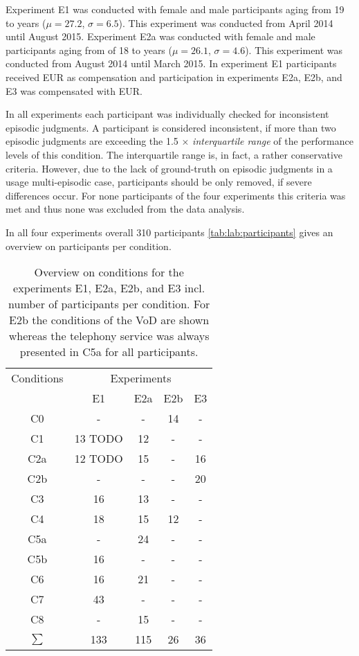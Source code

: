 Experiment E1 was conducted  with \unit[59]{female} and \unit[40]{male} participants aging from 19 to \unit[53]{years} ($\mu=27.2$, $\sigma=6.5$). %
This experiment was conducted from April 2014 until August 2015.
Experiment E2a was conducted with \unit[65]{female} and \unit[35]{male} participants aging from of 18 to \unit[50]{years} ($\mu=26.1$, $\sigma=4.6$). %
This experiment was conducted from August 2014 until March 2015.
In experiment E1 participants received \unit[15]{EUR} as compensation and participation in experiments E2a, E2b, and E3 was compensated with \unit[10]{EUR}.


In all experiments each participant was individually checked for inconsistent episodic judgments.
A participant is considered inconsistent, if more than two episodic judgments are exceeding the 1.5 $\times$ \emph{interquartile range} of the performance levels of this condition. %
The interquartile range is, in fact, a rather conservative criteria.
However, due to the lack of ground-truth on episodic judgments in a usage multi-episodic case, participants should be only removed, if severe differences occur.
For none participants of the four experiments this criteria was met and thus none was excluded from the data analysis.

In all four experiments overall 310 participants 
\autoref{tab:lab:participants} gives an overview on participants per condition.

\begin{table}
	\centering
	\begin{tabular}{c|c|c|c|c}
	Conditions & \multicolumn{4}{c}{Experiments} \\
			& E1	& E2a 	& E2b 	& E3\\
	\midrule
	C0		& -		& 	-	& 	14	&  - \\
	C1		& 13 TODO	&	12	&	-	&  - \\
	C2a		& 12 TODO	&	15	&	-	&  16\\
	C2b		& -		&	-	&	-	&  20\\
	C3		& 16	&	13	&	-	&  - \\
	C4		& 18	&	15	&	12	&  - \\
	C5a		& -		&	24	&	-	&  - \\
	C5b		& 16	&	-	&	-	&  - \\
	C6		& 16	&	21	&	-	&  - \\
	C7		& 43	&	-	&	-	&  - \\
	C8		& -		&	15 &	-	&  - \\ %
	\midrule
	$\sum$ 	& 133	&	115 &	26 	& 36 \\
	\end{tabular} %
	\caption{
	Overview on conditions for the experiments E1, E2a, E2b, and E3 incl. number of participants per condition.
	For E2b the conditions of the \ac{VoD} are shown whereas the telephony service was always presented in C5a for all participants.}
	\label{tab:lab:participants}
\end{table}

